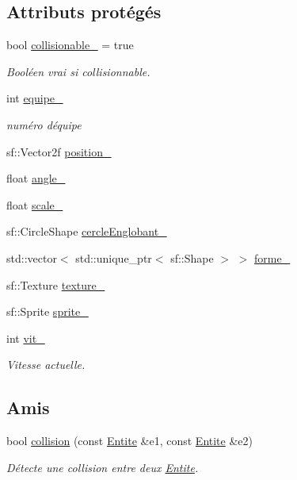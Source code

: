 \subsection*{Attributs protégés}
\begin{DoxyCompactItemize}
\item 
bool \hyperlink{class_entite_a37bb9bd568e9e1c904eaa83ec49a2b16}{collisionable\+\_\+} = true
\begin{DoxyCompactList}\small\item\em Booléen vrai si collisionnable. \end{DoxyCompactList}\item 
int \hyperlink{class_entite_a86f42758a3e4672052331b7a4daa10b5}{equipe\+\_\+}
\begin{DoxyCompactList}\small\item\em numéro d\textquotesingle{}équipe \end{DoxyCompactList}\item 
sf\+::\+Vector2f \hyperlink{class_entite_abbd554c4f122159a73cb113cc8de3860}{position\+\_\+}
\item 
float \hyperlink{class_entite_a2d6dc6bfcee492337b7422f12b393141}{angle\+\_\+}
\item 
float \hyperlink{class_entite_a50e0f8c1188d9833432c55c7f7d2aa0f}{scale\+\_\+}
\item 
sf\+::\+Circle\+Shape \hyperlink{class_entite_a5b6c62e4dc54221a84ce4dc824fdb2da}{cercle\+Englobant\+\_\+}
\item 
std\+::vector$<$ std\+::unique\+\_\+ptr$<$ sf\+::\+Shape $>$ $>$ \hyperlink{class_entite_aa6bbda9a40f701f273c344406a6f5122}{forme\+\_\+}
\item 
sf\+::\+Texture \hyperlink{class_entite_a8147b9459318a9b1de1b72dce115680a}{texture\+\_\+}
\item 
sf\+::\+Sprite \hyperlink{class_entite_ab7c03b6fe5c4f1d08cd3e4304e0ef7c0}{sprite\+\_\+}
\item 
int \hyperlink{class_entite_a62c3145096f707457d60306ea6729ed6}{vit\+\_\+}
\begin{DoxyCompactList}\small\item\em Vitesse actuelle. \end{DoxyCompactList}\end{DoxyCompactItemize}
\subsection*{Amis}
\begin{DoxyCompactItemize}
\item 
bool \hyperlink{class_entite_ac5011435e5099909dd34cd1750933b30}{collision} (const \hyperlink{class_entite}{Entite} \&e1, const \hyperlink{class_entite}{Entite} \&e2)
\begin{DoxyCompactList}\small\item\em Détecte une collision entre deux \hyperlink{class_entite}{Entite}. \end{DoxyCompactList}\end{DoxyCompactItemize}


